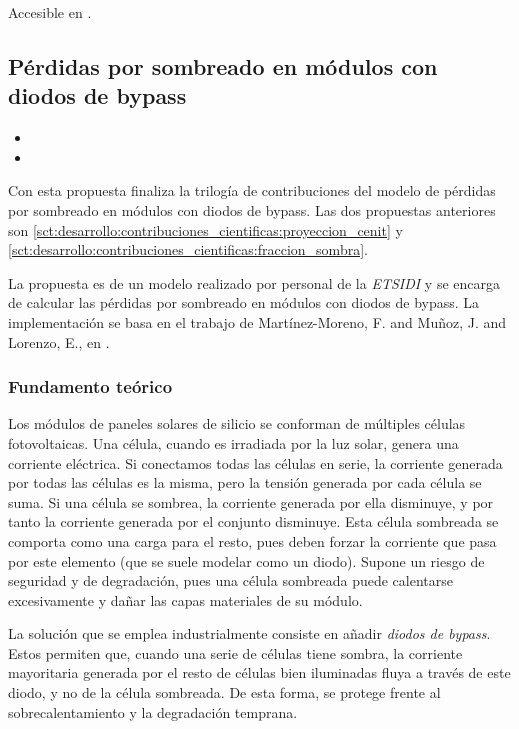 Accesible en .

\subsection{Pérdidas por sombreado en módulos con diodos de bypass} \label{sct:desarrollo:contribuciones_cientificas:perdidas_sombreado}

\begin{itemize}
    \item {}
    \item {}
\end{itemize}

Con esta propuesta finaliza la trilogía de contribuciones del modelo de pérdidas por sombreado en módulos con diodos de bypass. Las dos propuestas anteriores son \ref{sct:desarrollo:contribuciones_cientificas:proyeccion_cenit} y \ref{sct:desarrollo:contribuciones_cientificas:fraccion_sombra}.

La propuesta es de un modelo realizado por personal de la \textit{ETSIDI} y se encarga de calcular las pérdidas por sombreado en módulos con diodos de bypass. La implementación se basa en el trabajo de Martínez-Moreno, F. and Muñoz, J. and Lorenzo, E., en \cite{Martínez-Moreno_Muñoz_Lorenzo_2010}.

\subsubsection{Fundamento teórico}

Los módulos de paneles solares de silicio se conforman de múltiples células fotovoltaicas. Una célula, cuando es irradiada por la luz solar, genera una corriente eléctrica. Si conectamos todas las células en serie, la corriente generada por todas las células es la misma, pero la tensión generada por cada célula se suma. Si una célula se sombrea, la corriente generada por ella disminuye, y por tanto la corriente generada por el conjunto disminuye. Esta célula sombreada se comporta como una carga para el resto, pues deben forzar la corriente que pasa por este elemento (que se suele modelar como un diodo). Supone un riesgo de seguridad y de degradación, pues una célula sombreada puede calentarse excesivamente y dañar las capas materiales de su módulo.

La solución que se emplea industrialmente consiste en añadir \textit{diodos de bypass}. Estos permiten que, cuando una serie de células tiene sombra, la corriente mayoritaria generada por el resto de células bien iluminadas fluya a través de este diodo, y no de la célula sombreada. De esta forma, se protege frente al sobrecalentamiento y la degradación temprana.

